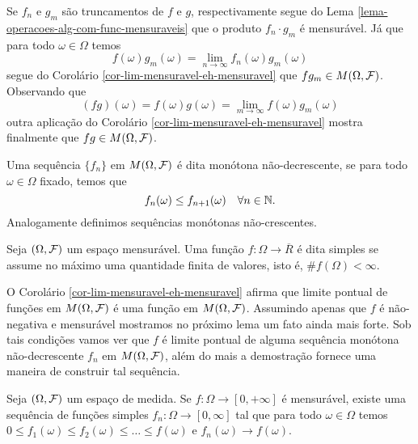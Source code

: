 Se $f_n$ e $g_m$ são truncamentos de $f$ e $g$, respectivamente
segue do Lema \ref{lema-operacoes-alg-com-func-mensuraveis}
que o produto $f_n\cdot g_m$ é mensurável. Já que 
para todo $\omega\in \Omega$ temos 
	\[
		f(\omega)g_m(\omega) 
		=
		\lim_{n\to\infty} f_n(\omega)g_m(\omega)
	\]
segue do Corolário \ref{cor-lim-mensuravel-eh-mensuravel}
que $fg_m \in M(\Omega,\mathcal{F})$. Observando que
	\[
		(fg)(\omega) 
		=
		f(\omega)g(\omega)
		=
		\lim_{m\to\infty} f(\omega)g_m(\omega)
	\]	
outra aplicação do Corolário \ref{cor-lim-mensuravel-eh-mensuravel}
mostra finalmente que $fg\in M(\Omega,\mathcal{F})$.




\begin{definicao}
 Uma sequência $\{f_n\}$ em $M(\Omega,\mathcal{F})$ é dita
 monótona não-decrescente, se para todo $\omega\in\Omega$
 fixado, temos que 
 	\[
 		f_n(\omega)\leq f_{n+1}(\omega)
 		\quad
 		\forall n\in\mathbb{N}.
 	\]
Analogamente definimos sequências monótonas não-crescentes.
\end{definicao}




\begin{definicao}
Seja $(\Omega,\mathcal{F})$ um espaço mensurável. 
Uma função $f:\Omega\to\overline{R}$ é dita 
simples se assume no máximo uma quantidade
finita de valores, isto é, $\# f(\Omega)<\infty$.

\end{definicao}



O Corolário \ref{cor-lim-mensuravel-eh-mensuravel} afirma que 
limite pontual de funções em $M(\Omega,\mathcal{F})$ é uma função em 
$M(\Omega,\mathcal{F})$.
Assumindo apenas que $f$ é não-negativa e mensurável
mostramos no próximo lema um fato ainda mais
forte. Sob tais condições vamos ver que  
$f$ é limite pontual de alguma sequência 
monótona não-decrescente $f_n$ em $M(\Omega,\mathcal{F})$,
além do mais a demostração fornece uma maneira de construir
tal sequência.

\begin{teorema}\label{teo:aproximacao-monotona-por-func-simples}
	Seja $(\Omega,\mathcal{F})$ um espaço de medida. 
	Se $f:\Omega\to [0,+\infty]$
	é mensurável, existe uma sequência de funções 
	simples $f_n:\Omega\to[0,\infty]$ tal que
	para todo $\omega\in\Omega$ temos
	$0\leq f_1(\omega)\leq f_2(\omega)\leq \ldots\leq f(\omega)$ 
	e 
	$f_n(\omega)\to f(\omega)$.
\end{teorema}


